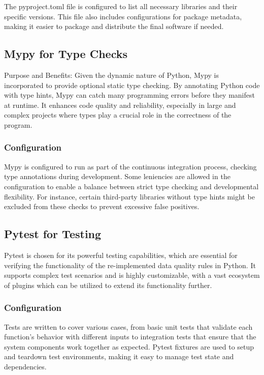 The pyproject.toml file is configured to list all necessary libraries and their specific versions. This file also includes configurations for package metadata, making it easier to package and distribute the final software if needed.

\subsection{Mypy for Type Checks}

Purpose and Benefits: Given the dynamic nature of Python, Mypy is incorporated to provide optional static type checking. By annotating Python code with type hints, Mypy can catch many programming errors before they manifest at runtime. It enhances code quality and reliability, especially in large and complex projects where types play a crucial role in the correctness of the program.

\subsubsection{Configuration}
Mypy is configured to run as part of the continuous integration process, checking type annotations during development. Some leniencies are allowed in the configuration to enable a balance between strict type checking and developmental flexibility. For instance, certain third-party libraries without type hints might be excluded from these checks to prevent excessive false positives.

\subsection{Pytest for Testing}

Pytest is chosen for its powerful testing capabilities, which are essential for verifying the functionality of the re-implemented data quality rules in Python. It supports complex test scenarios and is highly customizable, with a vast ecosystem of plugins which can be utilized to extend its functionality further.

\subsubsection{Configuration}

Tests are written to cover various cases, from basic unit tests that validate each function's behavior with different inputs to integration tests that ensure that the system components work together as expected. Pytest fixtures are used to setup and teardown test environments, making it easy to manage test state and dependencies.

